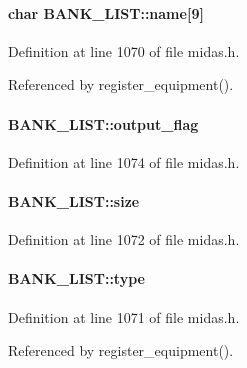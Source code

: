 \paragraph[{name}]{\setlength{\rightskip}{0pt plus 5cm}char {\bf BANK\_\-LIST::name}\mbox{[}9\mbox{]}}\hfill\label{structBANK__LIST_a108f74b9ebdca9718cfd91de54899325}

\begin{DoxyItemize}
\item 
\end{DoxyItemize}

Definition at line 1070 of file midas.h.

Referenced by register\_\-equipment().
\paragraph[{output\_\-flag}]{ {\bf BANK\_\-LIST::output\_\-flag}}\hfill\label{structBANK__LIST_ae2fa2419da6dc57ec48d57da2b18b58a}

\begin{DoxyItemize}
\item 
\end{DoxyItemize}

Definition at line 1074 of file midas.h.
\paragraph[{size}]{ {\bf BANK\_\-LIST::size}}\hfill\label{structBANK__LIST_a4208294c0d0b8b4df63102ff7d4eb887}

\begin{DoxyItemize}
\item 
\end{DoxyItemize}

Definition at line 1072 of file midas.h.
\paragraph[{type}]{ {\bf BANK\_\-LIST::type}}\hfill\label{structBANK__LIST_a949d7a28bdf3923796ffb2dff8f28690}

\begin{DoxyItemize}
\item 
\end{DoxyItemize}

Definition at line 1071 of file midas.h.

Referenced by register\_\-equipment().